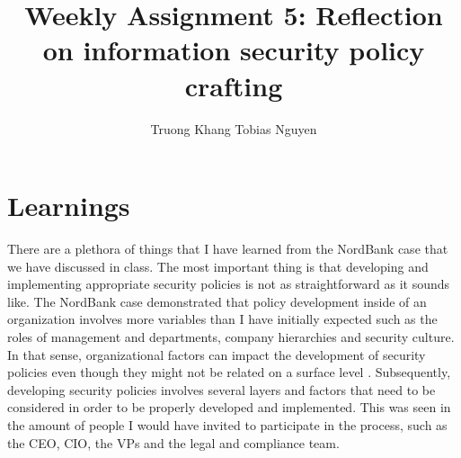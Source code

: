 \documentclass[12pt]{article}
\title{Weekly Assignment 5: Reflection on information security policy crafting}
\author{Truong Khang Tobias Nguyen}
\date{}
\begin{document}
\maketitle

\section{Learnings}
There are a plethora of things that I have learned from the NordBank case that we have discussed in class.
\newline
The most important thing is that developing and implementing appropriate security policies is not as straightforward as it sounds like. The NordBank case demonstrated that policy development inside of an organization involves more variables than I have initially expected such as the roles of management and departments, company hierarchies and security culture. In that sense, organizational factors can impact the development of security policies even though they might not be related on a surface level \cite{balagopal2024exploring}.
\newline
Subsequently, developing security policies involves several layers and factors that need to be considered in order to be properly developed and implemented. This was seen in the amount of people I would have invited to participate in the process, such as the CEO, CIO, the VPs and the legal and compliance team. 
\end{document}

